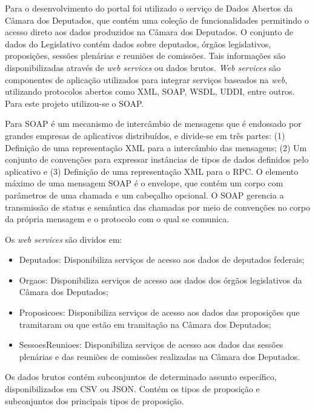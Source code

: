 \documentclass[
	12pt,				%
	openright,			%
	twoside,			%
	a4paper,			%
	english,			%
	french,				%
	spanish,			%
	brazil				%
	]{abntex2}
\begin{document}
Para o desenvolvimento do portal foi utilizado o serviço de Dados Abertos da Câmara dos Deputados, que contém uma coleção de 
funcionalidades permitindo o acesso direto aos dados produzidos na Câmara dos Deputados. O conjunto de dados do Legislativo contém dados sobre deputados, órgãos legislativos, proposições, sessões plenárias e reuniões 
de comissões. Tais informações são disponibilizadas através de \emph{web services} ou dados brutos. 
\emph{Web services} são componentes de aplicação utilizados para integrar serviços baseados na \emph{web}, utilizando protocolos 
abertos como XML, SOAP, WSDL, UDDI, entre outros. Para este projeto utilizou-se o SOAP. 

Para  SOAP é um mecanismo de intercâmbio de mensagens que é endossado por grandes empresas de aplicativos
distribuídos, e divide-se em três partes: (1) Definição de uma representação XML para a intercâmbio das mensagens; (2) Um 
conjunto de convenções para expressar instâncias de tipos de dados definidos pelo aplicativo e (3) Definição de uma 
representação XML para o RPC. O elemento máximo de uma mensagem SOAP é o envelope, que contém um corpo com parâmetros de uma 
chamada e um cabeçalho opcional. O SOAP gerencia a transmissão de status e semântica das chamadas por meio de convenções no 
corpo da própria mensagem e o protocolo com o qual se comunica.

Os \emph{web services} são dividos em:

\begin{itemize}
  \item Deputados: Disponibiliza serviços de acesso aos dados de deputados federais;
  \item Orgaos: Disponibiliza serviços de acesso aos dados dos órgãos legislativos da Câmara dos Deputados;
  \item Proposicoes: Disponibiliza serviços de acesso aos dados das proposições que tramitaram ou que estão em tramitação na Câmara dos Deputados;
  \item SessoesReunioes: Disponibiliza serviços de acesso aos dados das sessões plenárias e das reuniões de comissões realizadas na Câmara dos Deputados.
\end{itemize}

Os dados brutos contém subconjuntos de determinado assunto específico, disponibilizados em CSV ou JSON. Contém os tipos de 
proposição e subconjuntos dos principais tipos de proposição.
\end{document}
